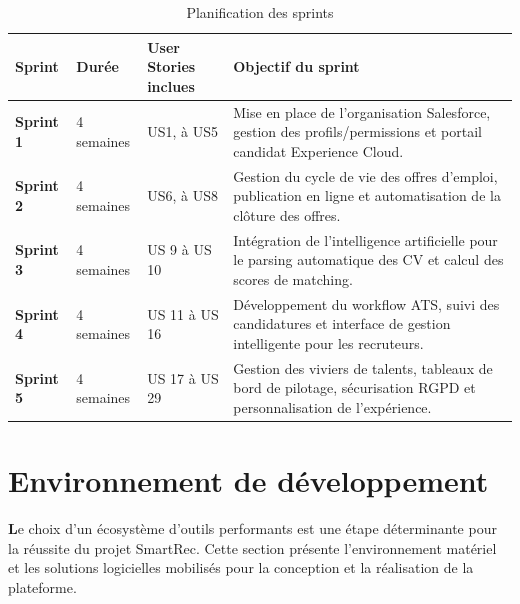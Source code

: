 \vspace{0.3cm}
\begin{table}[H]
\caption{Planification des sprints}
\begin{tabular}{|m{2cm}|m{2.5cm}|m{5cm}|m{6cm}|}
\hline
\rowcolor{WhiteSmoke} \arrayrulecolor{black}

\hfil{\cellcolor{WhiteSmoke}\textbf{Sprint}} &
\hfil{\cellcolor{WhiteSmoke}\textbf{Durée}} &
\hfil{\cellcolor{WhiteSmoke}\textbf{User Stories inclues}} &
\hfil{\cellcolor{WhiteSmoke}\textbf{Objectif du sprint}} \\
\hline

\textbf{Sprint 1} & 4 semaines &
US1, à US5 &
Mise en place de l'organisation Salesforce, gestion des profils/permissions et portail candidat Experience Cloud. \\
\hline

\textbf{Sprint 2} & 4 semaines &
US6, à US8 &
Gestion du cycle de vie des offres d'emploi, publication en ligne et automatisation de la clôture des offres. \\
\hline

\textbf{Sprint 3} & 4 semaines &
US 9 à US 10&
Intégration de l'intelligence artificielle pour le parsing automatique des CV et calcul des scores de matching. \\
\hline

\textbf{Sprint 4} & 4 semaines &
US 11 à US 16  &
Développement du workflow ATS, suivi des candidatures et interface de gestion intelligente pour les recruteurs. \\
\hline

\textbf{Sprint 5} & 4 semaines &
US 17 à US 29   &
Gestion des viviers de talents, tableaux de bord de pilotage, sécurisation RGPD et personnalisation de l'expérience. \\
\hline

\end{tabular}
\end{table}



 \section{ Environnement de développement }
 \hspace{0.5cm}\textbf Le choix d'un écosystème d'outils performants est une étape déterminante pour la réussite du projet SmartRec. Cette section présente l'environnement matériel et les solutions logicielles mobilisés pour la conception et la réalisation de la plateforme.


